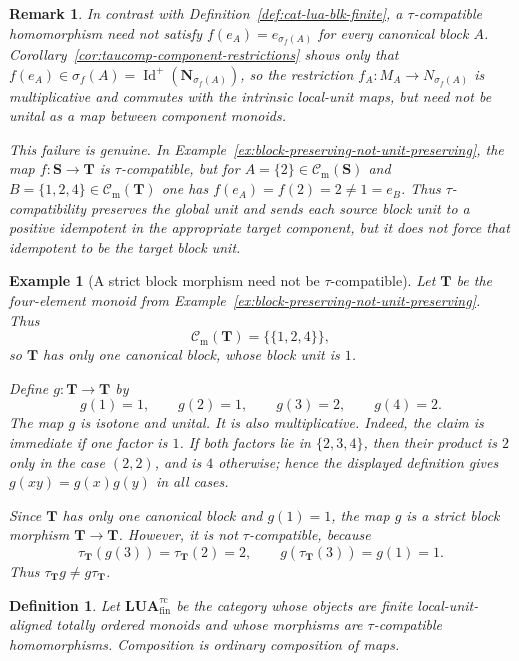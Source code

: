 \documentclass[pdflatex,sn-mathphys-num]{sn-jnl}
\theoremstyle{thmstyleone}%
\theoremstyle{thmstyletwo}%
\newtheorem{example}[theorem]{Example}
\newtheorem{remark}[theorem]{Remark}
\theoremstyle{thmstylethree}%
\newtheorem{definition}[theorem]{Definition}
\newcommand{\PosId}{\operatorname{Id}^{+}}
\newcommand{\Cm}{\mathcal C_{\mathrm m}}
\begin{document}
\begin{remark}\label{rem:taucomp-vs-block-unit-preservation}
In contrast with Definition~\ref{def:cat-lua-blk-finite}, a \(\tau\)-compatible homomorphism need not satisfy \(f(e_A)=e_{\sigma_f(A)}\) for every canonical block \(A\).
Corollary~\ref{cor:taucomp-component-restrictions} shows only that \(f(e_A)\in \sigma_f(A)=\PosId(\mathbf N_{\sigma_f(A)})\), so the restriction \(f_A\colon M_A\to N_{\sigma_f(A)}\) is multiplicative and commutes with the intrinsic local-unit maps, but need not be unital as a map between component monoids.

This failure is genuine.
In Example~\ref{ex:block-preserving-not-unit-preserving}, the map \(f\colon\mathbf S\to\mathbf T\) is \(\tau\)-compatible, but for \(A=\{2\}\in\Cm(\mathbf S)\) and \(B=\{1,2,4\}\in\Cm(\mathbf T)\) one has \(f(e_A)=f(2)=2\neq 1=e_B\).
Thus \(\tau\)-compatibility preserves the global unit and sends each source block unit to a positive idempotent in the appropriate target component, but it does not force that idempotent to be the target block unit.
\end{remark}

\begin{example}[A strict block morphism need not be \(\tau\)-compatible]
\label{ex:strict-block-not-tau-compatible}
Let \(\mathbf T\) be the four-element monoid from Example~\ref{ex:block-preserving-not-unit-preserving}.
Thus
\[
\Cm(\mathbf T)=\bigl\{\{1,2,4\}\bigr\},
\]
so \(\mathbf T\) has only one canonical block, whose block unit is \(1\).

Define \(g\colon \mathbf T\to\mathbf T\) by
\[
g(1)=1,\qquad g(2)=1,\qquad g(3)=2,\qquad g(4)=2.
\]
The map \(g\) is isotone and unital.
It is also multiplicative.
Indeed, the claim is immediate if one factor is \(1\).
If both factors lie in \(\{2,3,4\}\), then their product is \(2\) only in the case \((2,2)\), and is \(4\) otherwise; hence the displayed definition gives \(g(xy)=g(x)g(y)\) in all cases.

Since \(\mathbf T\) has only one canonical block and \(g(1)=1\), the map \(g\) is a strict block morphism \(\mathbf T\to\mathbf T\).
However, it is not \(\tau\)-compatible, because
\[
\tau_{\mathbf T}(g(3))=\tau_{\mathbf T}(2)=2,
\qquad
g(\tau_{\mathbf T}(3))=g(1)=1.
\]
Thus \(\tau_{\mathbf T}g\ne g\tau_{\mathbf T}\).
\end{example}

\begin{definition}\label{def:lua-taucomp-category}
Let \(\mathbf{LUA}^{\tau\mathrm{c}}_{\mathrm{fin}}\) be the category whose objects are finite local-unit-aligned totally ordered monoids and whose morphisms are \(\tau\)-compatible homomorphisms.
Composition is ordinary composition of maps.
\end{definition}
\end{document}

